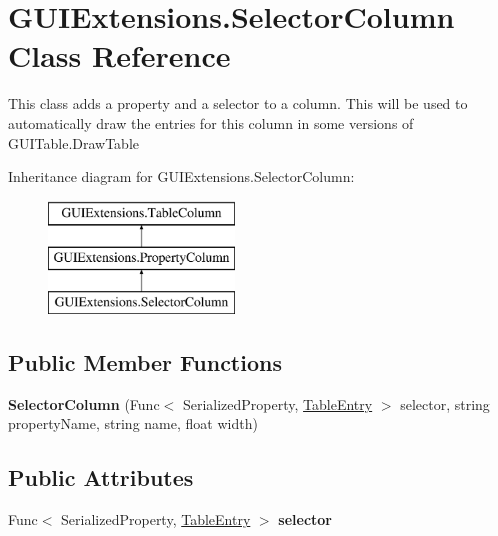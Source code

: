 \hypertarget{class_g_u_i_extensions_1_1_selector_column}{}\section{G\+U\+I\+Extensions.\+Selector\+Column Class Reference}
\label{class_g_u_i_extensions_1_1_selector_column}


This class adds a property and a selector to a column. This will be used to automatically draw the entries for this column in some versions of G\+U\+I\+Table.\+Draw\+Table  


Inheritance diagram for G\+U\+I\+Extensions.\+Selector\+Column\+:\begin{figure}[H]
\begin{center}
\leavevmode
\includegraphics[height=3.000000cm]{class_g_u_i_extensions_1_1_selector_column}
\end{center}
\end{figure}
\subsection*{Public Member Functions}
\begin{DoxyCompactItemize}
\item 
\mbox{\label{class_g_u_i_extensions_1_1_selector_column_aa1c9ebb87dc3d5043aef0ffa48765572}} 
{\bfseries Selector\+Column} (Func$<$ Serialized\+Property, \mbox{\hyperlink{class_g_u_i_extensions_1_1_table_entry}{Table\+Entry}} $>$ selector, string property\+Name, string name, float width)
\end{DoxyCompactItemize}
\subsection*{Public Attributes}
\begin{DoxyCompactItemize}
\item 
\mbox{\label{class_g_u_i_extensions_1_1_selector_column_a9b19236c8e6d155923d8b42485d7da4f}} 
Func$<$ Serialized\+Property, \mbox{\hyperlink{class_g_u_i_extensions_1_1_table_entry}{Table\+Entry}} $>$ {\bfseries selector}
\end{DoxyCompactItemize}
